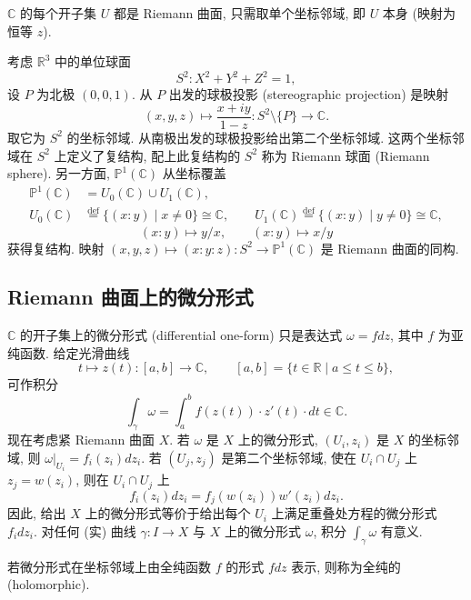 \begin{example} \label{thm:3.3.1} 
$\mathbb{C}$ 的每个开子集 $U$ 都是 Riemann 曲面, 只需取单个坐标邻域, 即 $U$ 本身 (映射为恒等 $z$).
\end{example}

\begin{example} \label{thm:3.3.2} 
考虑 $\mathbb{R}^3$ 中的单位球面
\[
S^2\colon X^2 + Y^2 + Z^2 = 1,
\]
设 $P$ 为北极 $(0, 0, 1)$. 从 $P$ 出发的球极投影 (stereographic projection) 是映射
\[
(x, y, z)\mapsto\frac{x + iy}{1 - z}\colon S^2\setminus\{P\}\to\mathbb{C}.
\]
取它为 $S^2$ 的坐标邻域. 从南极出发的球极投影给出第二个坐标邻域. 这两个坐标邻域在 $S^2$ 上定义了复结构, 配上此复结构的 $S^2$ 称为 Riemann 球面 (Riemann sphere). 另一方面, $\mathbb{P}^1(\mathbb{C})$ 从坐标覆盖
\begin{align*}
\mathbb{P}^1(\mathbb{C}) &= U_0(\mathbb{C})\cup U_1(\mathbb{C}),\\
U_0(\mathbb{C}) &\overset{\text{def}}{=} \{(x:y) \mid x\neq 0\}\cong\mathbb{C}, \qquad
U_1(\mathbb{C}) \overset{\text{def}}{=} \{(x:y) \mid y\neq 0\}\cong\mathbb{C},
\end{align*}
\[
(x:y)\mapsto y/x, \qquad (x:y)\mapsto x/y
\]
获得复结构. 映射 $(x, y, z)\mapsto(x:y:z)\colon S^2\to\mathbb{P}^1(\mathbb{C})$ 是 Riemann 曲面的同构.
\end{example}

\subsection*{Riemann 曲面上的微分形式}

$\mathbb{C}$ 的开子集上的微分形式 (differential one-form) 只是表达式 $\omega = fdz$, 其中 $f$ 为亚纯函数. 给定光滑曲线
\[
t\mapsto z(t)\colon[a, b]\to\mathbb{C}, \qquad [a, b] = \{t\in\mathbb{R} \mid a\le t\le b\},
\]
可作积分
\[
\int_\gamma\omega = \int_a^b f(z(t))\cdot z'(t)\cdot dt\in\mathbb{C}.
\]
现在考虑紧 Riemann 曲面 $X$. 若 $\omega$ 是 $X$ 上的微分形式, $(U_i, z_i)$ 是 $X$ 的坐标邻域, 则 $\omega|_{U_i} = f_i(z_i)dz_i$. 若 $(U_j, z_j)$ 是第二个坐标邻域, 使在 $U_i\cap U_j$ 上 $z_j = w(z_i)$, 则在 $U_i\cap U_j$ 上
\[
f_i(z_i)dz_i = f_j(w(z_i))w'(z_i)dz_i.
\]
因此, 给出 $X$ 上的微分形式等价于给出每个 $U_i$ 上满足重叠处方程的微分形式 $f_idz_i$. 对任何 (实) 曲线 $\gamma\colon I\to X$ 与 $X$ 上的微分形式 $\omega$, 积分 $\int_\gamma\omega$ 有意义.

若微分形式在坐标邻域上由全纯函数 $f$ 的形式 $fdz$ 表示, 则称为全纯的 (holomorphic).

